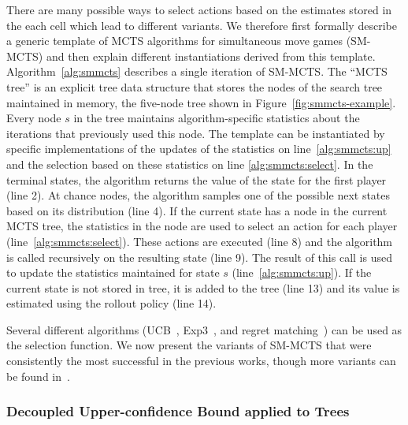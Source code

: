 There are many possible ways to select actions based on the estimates stored in the each cell which lead to different variants.
We therefore first formally describe a generic template of MCTS algorithms for simultaneous move games (SM-MCTS) and then explain different instantiations derived from this template.
Algorithm~\ref{alg:smmcts} describes a single iteration of SM-MCTS.
The ``MCTS tree'' is an explicit tree data structure that stores the nodes of the search tree maintained in memory,
\eg the five-node tree shown in Figure~\ref{fig:smmcts-example}.
Every node $s$ in the tree maintains algorithm-specific statistics about the iterations that previously used this node.
The template can be instantiated by specific implementations of the updates of the statistics on line~\ref{alg:smmcts:up} and the selection based on these statistics on line \ref{alg:smmcts:select}.
In the terminal states, the algorithm returns the value of the state for the first player (line 2).
At chance nodes, the algorithm samples one of the possible next states based on its distribution (line 4).
If the current state has a node in the current MCTS tree, the statistics in the node are used to select an action for each player (line~\ref{alg:smmcts:select}).
These actions are executed (line 8) and the algorithm is called recursively on the resulting state (line 9).
The result of this call is used to update the statistics maintained for state $s$ (line~\ref{alg:smmcts:up}).
If the current state is not stored in tree, it is added to the tree (line 13) and its value is estimated using the rollout policy (line 14).

Several different algorithms (\eg UCB~\cite{UCB}, Exp3~\cite{Auer2003Exp3}, and regret matching~\cite{Hart00}) can be used as the selection function.
We now present the variants of SM-MCTS that were consistently the most successful in the previous works,
though more variants can be found in~\cite{Perick12Comparison,Lanctot13Tron,Tak14smmcts}.

\subsubsection{Decoupled Upper-confidence Bound applied to Trees}\label{sec:duct}

